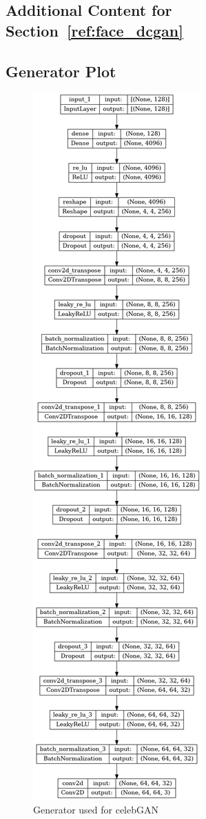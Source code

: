 \begin{appendix}
\clearpage
\section{Additional Content for Section~\ref{ref:face_dcgan}}
\subsection{Generator Plot}
\label{apx:dcgan_generator}
\begin{figure}[H]
    \includegraphics[width=.36\textwidth]{images/Generator.png}
    \centering
    \caption{Generator used for celebGAN}
\end{figure}


\end{appendix}
